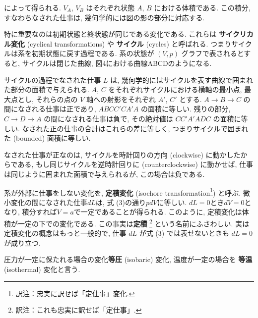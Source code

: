 によって得られる. $V_{A}$, $V_{B}$ はそれぞれ状態 $A$, $B$ における体積である. この積分, すなわちなされた仕事は, 幾何学的には図の影の部分に対応する. \par
特に重要なのは初期状態と終状態が同じである変化である. これらは \textbf{サイクリカル変化} (cyclical transformations) や \textbf{サイクル} (cycles) と呼ばれる. つまりサイクルは系を初期状態に戻す過程である. 系の状態が $(V, p)$ グラフで表されるとすると, サイクルは閉じた曲線, 図4における曲線ABCDのようになる. \par
サイクルの過程でなされた仕事 $L$ は, 幾何学的にはサイクルを表す曲線で囲まれた部分の面積で与えられる. $A$, $C$ をそれぞれサイクルにおける横軸の最小点, 最大点とし, それらの点の $V$ 軸への射影をそれぞれ $A'$, $C'$ とする. $A \to B \to C$ の間になされる仕事は正であり, $ABCC'CA'A$ の面積に等しい. 残りの部分, $C \to D \to A$ の間になされる仕事は負で, その絶対値は $CC'A'ADC$ の面積に等しい. なされた正の仕事の合計はこれらの差に等しく, つまりサイクルで囲まれた (bounded) 面積に等しい. \par
なされた仕事が正なのは, サイクルを時計回りの方向 (clockwise) に動かしたからである, もし同じサイクルを逆時計回りに (counterclockwise) に動かせば, 仕事は同じように囲まれた面積で与えられるが, この場合は負である. \par
系が外部に仕事をしない変化を, \textbf{定積変化} (isochore transformation\footnote{訳注：忠実に訳せば「定仕事」変化. }) と呼ぶ. 微小変化の間になされた仕事$dL$は, 式 (3)の通り$pdV$に等しい. $dL=0$とき$dV=0$となり, 積分すれば$V=a$で一定であることが得られる. このように, 定積変化は体積が一定の下での変化である. この事実は{\bf 定積} \footnote{訳注：これも忠実に訳せば「定仕事」. } という名前にふさわしい. 実は定積変化の概念はもっと一般的で, 仕事 $dL$ が式 (3) では表せないときも $dL=0$ が成り立つ. \par
圧力が一定に保たれる場合の変化\textbf{等圧} (isobaric) 変化, 温度が一定の場合を \textbf{等温} (isothermal) 変化と言う.

